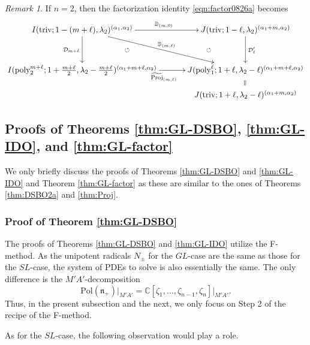 \documentclass[reqno,11pt]{amsart}
\theoremstyle{remark}
\newtheorem{rem}[equation]{Remark}
\theoremstyle{definition}
\numberwithin{equation}{section}
\newcommand{\ga}{\alpha}
\newcommand{\fn}{{\mathfrak n}}
\newcommand{\C}{\mathbb{C}}
\newcommand{\Cal}{\mathcal}
\newcommand{\Pol}{\mathrm{Pol}}
\newcommand{\poly}{\mathrm{poly}}
\newcommand{\triv}{\mathrm{triv}}
\newcommand{\wProj}{\widetilde{\mathrm{Proj}}}
\newcommand{\D}{\Cal{D}}
\newcommand{\bD}{\mathbb{D}}
\begin{document}
\begin{rem}
If $n=2$, then the factorization identity \eqref{eqn:factor0826a} becomes
\begin{equation*}
\xymatrix@=13pt{
I(\triv; 1-(m+\ell),\lambda_2)^{(\ga_1,\ga_2)}
 \ar[dd]_{\D_{m+\ell}}
  \ar[rrdd]^{\bD_{(m,\ell)}}
  \ar[rr]^{\bD_{(m,0)}}
 && J(\triv; 1-\ell,\lambda_2)^{(\ga_1+m,\ga_2)}
  \ar[dd]^{\D'_\ell}
  \ar@{}[ldd]|{\circlearrowleft}
 \\
&&\\
I(\poly^{m+\ell}_2; 1+\tfrac{m+\ell}{2},\lambda_2-\frac{m+\ell}{2})^{(\ga_1+m+\ell,\ga_2)}
\ar[rr]_{\wProj_{(m,\ell)}}   \ar@{}[ruu]|{\circlearrowleft}
&&
J(\poly^\ell_{1}; 1+\ell,\lambda_2-\ell)^{(\ga_1+m+\ell,\ga_2)}
\ar@{}[d]|{\rotatebox{90}{$=$}}\\
&&
J(\triv; 1+\ell,\lambda_2-\ell)^{(\ga_1+m,\ga_2)}
}
\end{equation*}
\end{rem}

\subsection{
Proofs of Theorems \ref{thm:GL-DSBO}, \ref{thm:GL-IDO}, and \ref{thm:GL-factor}
}
\label{sec:GL-proof}

We only briefly discuss the proofs of Theorems 
\ref{thm:GL-DSBO} and \ref{thm:GL-IDO} and 
Theorem \ref{thm:GL-factor} as these are  similar 
to the ones of Theorems \ref{thm:DSBO2a} and \ref{thm:Proj}.


\subsubsection{
Proof of Theorem \ref{thm:GL-DSBO}
}
\label{sec:GL-proof1}

The proofs of Theorems \ref{thm:GL-DSBO} and \ref{thm:GL-IDO} utilize
the F-method. As the unipotent radicals $N_{\pm}$ for the $GL$-case are the same as
those for the $SL$-case, the system of PDEs to solve is also essentially the same.
The only difference is the $M'A'$-decomposition 
\begin{equation*}
\Pol(\fn_+)\vert_{M'A'} = \C[\zeta_1,\ldots, \zeta_{n-1},\zeta_n]\vert_{M'A'}.
\end{equation*}
Thus, in the present subsection and the next, we only focus on Step 2 of the
recipe of the F-method.

As for the $SL$-case,
the following observation would play a role.
\end{document}
